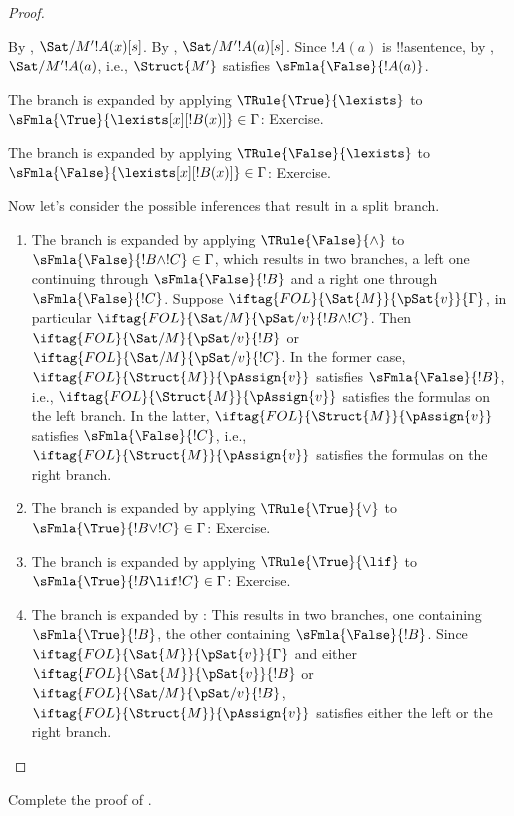 \documentclass[../../../include/open-logic-section]{subfiles}
\begin{document}
\begin{proof}
\begin{enumerate}
{  By , $\Sat/{M'}{!A(x)}[s]$.  By
  , $\Sat/{M'}{!A(a)}[s]$.  Since
  $!A(a)$ is !!a{sentence}, by
  , $\Sat/{M'}{!A(a)}$, i.e.,
  $\Struct{M'}$ satisfies $\sFmla{\False}{!A(a)}$.
\item The branch is expanded by applying $\TRule{\True}{\lexists}$ to
  $\sFmla{\True}{\lexists[x][!B(x)]} \in \Gamma$: Exercise.
\item The branch is expanded by applying $\TRule{\False}{\lexists}$ to
  $\sFmla{\False}{\lexists[x][!B(x)]} \in \Gamma$: Exercise.}{}
\end{enumerate}
Now let's consider the possible inferences that result in a split branch.
\begin{enumerate}
\item The branch is expanded by applying $\TRule{\False}{\land}$ to
  $\sFmla{\False}{!B \land !C} \in \Gamma$, which results in two
  branches, a left one continuing through $\sFmla{\False}{!B}$ and a
  right one through $\sFmla{\False}{!C}$. Suppose
  $\iftag{FOL}{\Sat{M}}{\pSat{v}}{\Gamma}$, in particular
  $\iftag{FOL}{\Sat/{M}}{\pSat/{v}}{!B \land !C}$.  Then
  $\iftag{FOL}{\Sat/{M}}{\pSat/{v}}{!B}$ or
  $\iftag{FOL}{\Sat/{M}}{\pSat/{v}}{!C}$. In the former case,
  $\iftag{FOL}{\Struct{M}}{\pAssign{v}}$ satisfies
  $\sFmla{\False}{!B}$, i.e., $\iftag{FOL}{\Struct{M}}{\pAssign{v}}$
  satisfies the formulas on the left branch. In the latter,
  $\iftag{FOL}{\Struct{M}}{\pAssign{v}}$ satisfies
  $\sFmla{\False}{!C}$, i.e., $\iftag{FOL}{\Struct{M}}{\pAssign{v}}$
  satisfies the formulas on the right branch.
\item The branch is expanded by applying $\TRule{\True}{\lor}$ to
  $\sFmla{\True}{!B \lor !C} \in \Gamma$: Exercise.
\item The branch is expanded by applying $\TRule{\True}{\lif}$ to
  $\sFmla{\True}{!B \lif !C} \in \Gamma$: Exercise.
\item The branch is expanded by \Cut: This results in two branches,
  one containing $\sFmla{\True}{!B}$, the other containing
  $\sFmla{\False}{!B}$. Since $\iftag{FOL}{\Sat{M}}{\pSat{v}}{\Gamma}$
  and either $\iftag{FOL}{\Sat{M}}{\pSat{v}}{!B}$ or
  $\iftag{FOL}{\Sat/{M}}{\pSat/{v}}{!B}$,
  $\iftag{FOL}{\Struct{M}}{\pAssign{v}}$ satisfies either the left or
  the right branch.
\end{enumerate}
\end{proof}

\begin{prob}
Complete the proof of .
\end{prob}
\tagendprob
\end{document}
